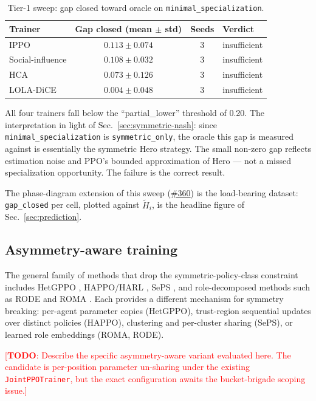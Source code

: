 \documentclass{article}
\newcommand{\TODO}[1]{\textcolor{red}{[\textbf{TODO}: #1]}}
\begin{document}
\begin{table}[ht]
  \centering
  \caption{Tier-1 sweep: gap closed toward oracle on \texttt{minimal\_specialization}.}
  \label{tab:tier1}
  \begin{tabular}{lccl}
    \toprule
    Trainer & Gap closed (mean $\pm$ std) & Seeds & Verdict \\
    \midrule
    IPPO            & $0.113 \pm 0.074$ & 3 & insufficient \\
    Social-influence & $0.108 \pm 0.032$ & 3 & insufficient \\
    HCA             & $0.073 \pm 0.126$ & 3 & insufficient \\
    LOLA-DiCE       & $0.004 \pm 0.048$ & 3 & insufficient \\
    \bottomrule
  \end{tabular}
\end{table}

All four trainers fall below the ``partial\_lower'' threshold of 0.20.
The interpretation in light of Sec.~\ref{sec:symmetric-nash}: since
\texttt{minimal\_specialization} is \texttt{symmetric\_only}, the oracle this
gap is measured against is essentially the symmetric Hero strategy.  The small
non-zero gap reflects estimation noise and PPO's bounded approximation of
Hero — not a missed specialization opportunity.  The failure is the correct
result.

The phase-diagram extension of this sweep
(\href{https://github.com/rjwalters/bucket-brigade/issues/360}{\#360}) is the
load-bearing dataset: \texttt{gap\_closed} per cell, plotted against
$\tilde{H}_i$, is the headline figure of Sec.~\ref{sec:prediction}.

\subsection{Asymmetry-aware training}

The general family of methods that drop the symmetric-policy-class constraint
includes HetGPPO \cite{bettini2023hetgppo}, HAPPO/HARL \cite{zhong2024harl},
SePS \cite{christianos2021selective}, and role-decomposed methods such as
RODE \cite{wang2021rode} and ROMA \cite{wang2020roma}.  Each provides a
different mechanism for symmetry breaking: per-agent parameter copies
(HetGPPO), trust-region sequential updates over distinct policies (HAPPO),
clustering and per-cluster sharing (SePS), or learned role embeddings (ROMA,
RODE).

\TODO{Describe the specific asymmetry-aware variant evaluated here.  The
candidate is per-position parameter un-sharing under the existing
\texttt{JointPPOTrainer}, but the exact configuration awaits the
bucket-brigade scoping issue.}
\end{document}
